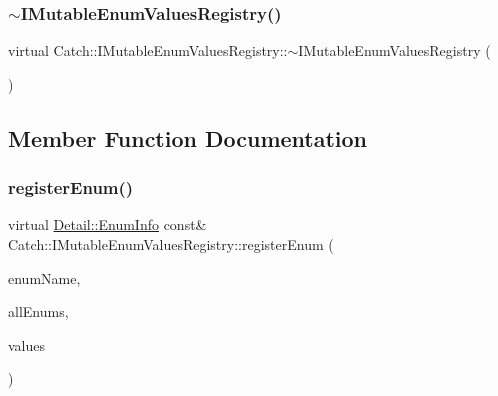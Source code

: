 \subsubsection{\texorpdfstring{$\sim$IMutableEnumValuesRegistry()}{~IMutableEnumValuesRegistry()}}
{\footnotesize\ttfamily virtual Catch\+::\+I\+Mutable\+Enum\+Values\+Registry\+::$\sim$\+I\+Mutable\+Enum\+Values\+Registry (\begin{DoxyParamCaption}{ }\end{DoxyParamCaption})\hspace{0.3cm}{\ttfamily [virtual]}}



\subsection{Member Function Documentation}
\mbox{\label{struct_catch_1_1_i_mutable_enum_values_registry_a948e66e85f5b66ab68256d50bfe548f4}} 
\subsubsection{\texorpdfstring{registerEnum()}{registerEnum()}\hspace{0.1cm}{\footnotesize\ttfamily [1/2]}}
{\footnotesize\ttfamily virtual \mbox{\hyperlink{struct_catch_1_1_detail_1_1_enum_info}{Detail\+::\+Enum\+Info}} const\& Catch\+::\+I\+Mutable\+Enum\+Values\+Registry\+::register\+Enum (\begin{DoxyParamCaption}\item[{\mbox{\hyperlink{class_catch_1_1_string_ref}{String\+Ref}}}]{enum\+Name,  }\item[{\mbox{\hyperlink{class_catch_1_1_string_ref}{String\+Ref}}}]{all\+Enums,  }\item[{std\+::vector$<$ int $>$ const \&}]{values }\end{DoxyParamCaption})\hspace{0.3cm}{\ttfamily [pure virtual]}}

\mbox{\label{struct_catch_1_1_i_mutable_enum_values_registry_a60e4546c6fd45f9be68e43410403b562}} 
